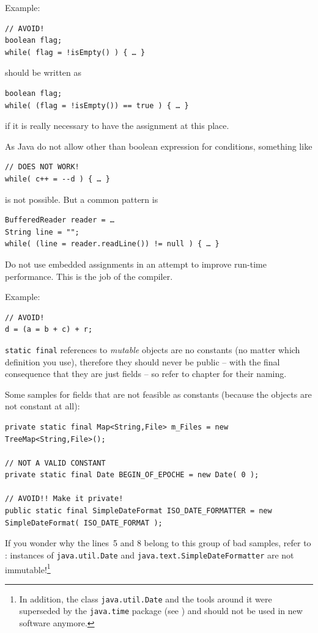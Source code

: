 \begin{itemize}
{Example:
\begin{lstlisting}
// AVOID!
boolean flag;
while( flag = !isEmpty() ) { … }
\end{lstlisting}
should be written as
\begin{lstlisting}
boolean flag;
while( (flag = !isEmpty()) == true ) { … }
\end{lstlisting}
if it is really necessary to have the assignment at this place.

As Java do not allow other than boolean expression for conditions, something like
\begin{lstlisting}
// DOES NOT WORK!
while( c++ = --d ) { … }
\end{lstlisting}
is not possible. But a common pattern is
\begin{lstlisting}
BufferedReader reader = …
String line = "";
while( (line = reader.readLine()) != null ) { … }
\end{lstlisting}
Do not use embedded assignments in an attempt to improve run-time performance. This is the job of the compiler. 

Example: 
\begin{lstlisting}
// AVOID!
d = (a = b + c) + r;        
\end{lstlisting}\lstinline|static final| references to \textit{mutable} objects are no constants (no matter which definition you use), therefore they should never be public – with the final consequence that they are just fields – so refer to chapter  for their naming.

Some samples for fields that are not feasible as constants (because the objects are not constant at all):
\begin{lstlisting}
private static final Map<String,File> m_Files = new TreeMap<String,File>();

// NOT A VALID CONSTANT
private static final Date BEGIN_OF_EPOCHE = new Date( 0 );

// AVOID!! Make it private!
public static final SimpleDateFormat ISO_DATE_FORMATTER = new SimpleDateFormat( ISO_DATE_FORMAT );
\end{lstlisting}

If you wonder why the lines~5 and 8 belong to this group of bad samples, refer to \autocite{ORACLE_DOC_DATE_CLASS,ORACLE_DOC_SIMPLEDATEFORMATTER_CLASS}: instances of \lstinline|java.util.Date| and \lstinline|java.text.SimpleDateFormatter| are not immutable!\footnote{In addition, the class \lstinline|java.util.Date| and the tools around it were superseded by the \lstinline|java.time| package (see \autocite{ORACLE_DOC_TIME_PACKAGE}) and should not be used in new software anymore.}


}
\end{itemize}
